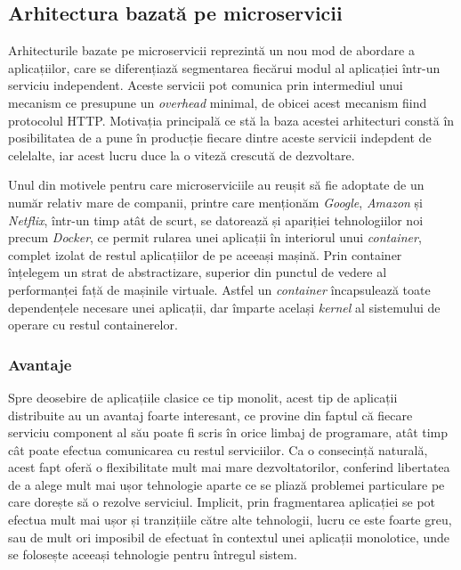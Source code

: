\subsection{Arhitectura bazată pe microservicii}

Arhitecturile bazate pe microservicii reprezintă un nou mod de abordare a aplicațiilor, care se diferențiază segmentarea fiecărui modul al aplicației într-un serviciu independent. Aceste servicii pot comunica prin intermediul unui mecanism ce presupune un \textit{overhead} minimal, de obicei acest mecanism fiind protocolul HTTP\cite{onmicro}. Motivația principală ce stă la baza acestei arhitecturi constă în posibilitatea de a pune în producție fiecare dintre aceste servicii indepdent de celelalte, iar acest lucru duce la o viteză crescută de dezvoltare.

Unul din motivele pentru care microserviciile au reușit să fie adoptate de un număr relativ mare de companii, printre care menționăm \textit{Google}, \textit{Amazon} și \textit{Netflix}, într-un timp atât de scurt, se datorează și apariției tehnologiilor noi precum \textit{Docker}, ce permit rularea unei aplicații în interiorul unui \textit{container}, complet izolat de restul aplicațiilor de pe aceeași mașină. Prin container înțelegem un strat de abstractizare, superior din punctul de vedere al performanței față de mașinile virtuale. Astfel un \textit{container} încapsulează toate dependențele necesare unei aplicații, dar împarte același \textit{kernel} al sistemului de operare cu restul containerelor. 

\subsubsection{Avantaje}

Spre deosebire de aplicațiile clasice ce tip monolit, acest tip de aplicații distribuite au un avantaj foarte interesant, ce provine din faptul că fiecare serviciu component al său poate fi scris în orice limbaj de programare, atât timp cât poate efectua comunicarea cu restul serviciilor. Ca o consecință naturală, acest fapt oferă o flexibilitate mult mai mare dezvoltatorilor, conferind libertatea de a alege mult mai ușor tehnologie aparte ce se pliază problemei particulare pe care dorește să o rezolve serviciul. Implicit, prin fragmentarea aplicației se pot efectua mult mai ușor și tranzițiile către alte tehnologii, lucru ce este foarte greu, sau de mult ori imposibil de efectuat în contextul unei aplicații monolotice, unde se folosește aceeași tehnologie pentru întregul sistem.


